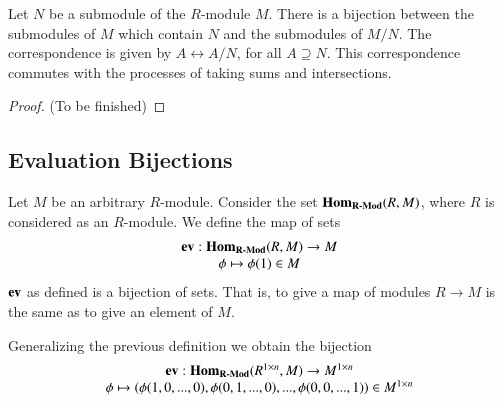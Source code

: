 \documentclass[12pt, a4paper, oneside, openright, titlepage]{book}
\begin{document}
\begin{namthm}\label{thmname:lattisomod}
    Let $N$ be a submodule of the $R$-module $M$. There is a bijection between the submodules of $M$ which contain $N$ and the submodules of $M/N$. The correspondence is given by $A\leftrightarrow A/N$, for all $A\supseteq N$. This correspondence commutes with the processes of taking sums and intersections.
\end{namthm}
\begin{proof}
    (To be finished)
\end{proof}



\subsection{\textsection Evaluation Bijections}

\begin{defn}
    Let $M$ be an arbitrary $R$-module. Consider the set $\mathbf{Hom}_{\normalfont\textbf{R-Mod}}(R,M)$, where $R$ is considered as an $R$-module. We define the map of sets \begin{equation}
        \begin{array}{c} \operatorname{\bf{ev}}:\mathbf{Hom}_{\normalfont\textbf{R-Mod}}(R,M) \rightarrow M \\ \phi\mapsto \phi(1) \in M \end{array}
    \end{equation}
    $\operatorname{\bf{ev}}$ as defined is a bijection of sets. That is, to give a map of modules $R\rightarrow M$ is the same as to give an element of $M$.
\end{defn}

\begin{defn}
    Generalizing the previous definition we obtain the bijection \begin{equation}
        \begin{array}{c} \operatorname{\bf{ev}}:\mathbf{Hom}_{\normalfont\textbf{R-Mod}}(R^{1\times n},M) \rightarrow M^{1\times n} \\ \phi\mapsto (\phi(1,0,...,0),\phi(0,1,...,0),...,\phi(0,0,...,1)) \in M^{1\times n} \end{array}
    \end{equation}
\end{defn}
\end{document}
